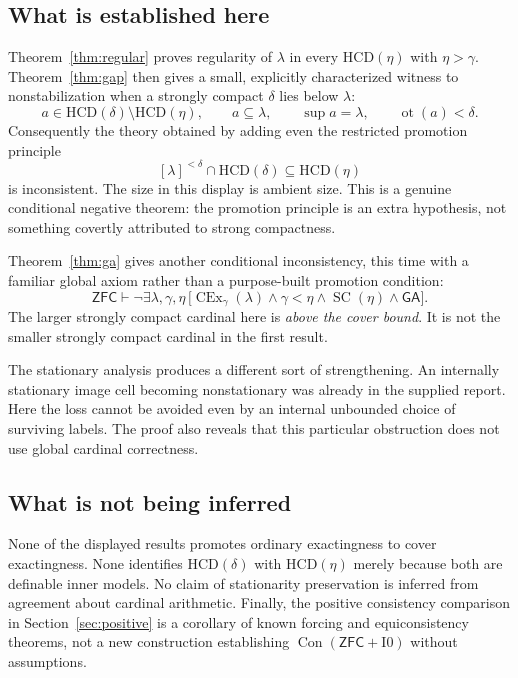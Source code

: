 \documentclass[11pt,letterpaper]{article}
\theoremstyle{definition}
\newcommand{\ZFC}{\mathsf{ZFC}}
\newcommand{\SC}{\operatorname{SC}}
\newcommand{\CEx}{\operatorname{CEx}}
\newcommand{\Con}{\operatorname{Con}}
\newcommand{\ot}{\operatorname{ot}}
\newcommand{\Izero}{\mathrm{I0}}
\newcommand{\HCD}{\mathrm{HCD}}
\newcommand{\GA}{\mathsf{GA}}
\newcommand{\Cex}[2]{\CEx_{#1}(#2)}
\theoremstyle{remark}
\begin{document}
\subsection{What is established here}

Theorem~\ref{thm:regular} proves regularity of $\lambda$ in every $\HCD(\eta)$ with $\eta>\gamma$. Theorem~\ref{thm:gap} then gives a small, explicitly characterized witness to nonstabilization when a strongly compact $\delta$ lies below $\lambda$:
\[
 a\in\HCD(\delta)\setminus\HCD(\eta),\qquad
 a\subseteq\lambda,\qquad \sup a=\lambda,\qquad \ot(a)<\delta.
\]
Consequently the theory obtained by adding even the restricted promotion principle
\[
 [\lambda]^{<\delta}\cap\HCD(\delta)\subseteq\HCD(\eta)
\]
is inconsistent. The size in this display is ambient size. This is a genuine conditional negative theorem: the promotion principle is an extra hypothesis, not something covertly attributed to strong compactness.

Theorem~\ref{thm:ga} gives another conditional inconsistency, this time with a familiar global axiom rather than a purpose-built promotion condition:
\[
 \ZFC\vdash
 \neg\exists\lambda,\gamma,\eta\,
 \bigl[\Cex{\gamma}{\lambda}\wedge\gamma<\eta
       \wedge\SC(\eta)\wedge\GA\bigr].
\]
The larger strongly compact cardinal here is \emph{above the cover bound}. It is not the smaller strongly compact cardinal in the first result.

The stationary analysis produces a different sort of strengthening. An internally stationary image cell becoming nonstationary was already in the supplied report. Here the loss cannot be avoided even by an internal unbounded choice of surviving labels. The proof also reveals that this particular obstruction does not use global cardinal correctness.

\subsection{What is not being inferred}

None of the displayed results promotes ordinary exactingness to cover exactingness. None identifies $\HCD(\delta)$ with $\HCD(\eta)$ merely because both are definable inner models. No claim of stationarity preservation is inferred from agreement about cardinal arithmetic. Finally, the positive consistency comparison in Section~\ref{sec:positive} is a corollary of known forcing and equiconsistency theorems, not a new construction establishing $\Con(\ZFC+\Izero)$ without assumptions.
\end{document}
